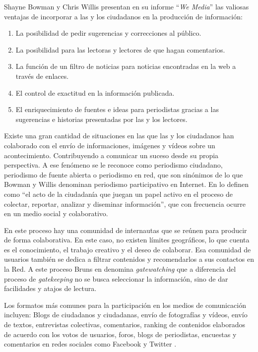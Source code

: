 Shayne Bowman y Chris Willis presentan en su informe ``\emph{We Media}'' \cite{wethemedia} las valiosas ventajas de incorporar a las y los ciudadanos en la producción de información:
\begin{enumerate}
\item La posibilidad de pedir sugerencias y correcciones al público.
\item La posibilidad para las lectoras y lectores de que hagan comentarios.
\item La función de un filtro de noticias para noticias encontradas en la web a través de enlaces.
\item El control de exactitud en la información publicada.
\item El enriquecimiento de fuentes e ideas para periodistas gracias a las sugerencias e historias presentadas por las y los lectores.
\end{enumerate}

Existe una gran cantidad de situaciones en las que las y los ciudadanos han colaborado con el envío de informaciones, imágenes y vídeos sobre un acontecimiento. Contribuyendo a comunicar un suceso desde su propia perspectiva. 
A ese fenómeno se le reconoce como periodismo ciudadano, periodismo de fuente abierta o periodismo en red, que son sinónimos de lo que Bowman y Willis denominan periodismo participativo en Internet. En \cite{wethemedia} lo definen como ``el acto de la ciudadanía que juegan un papel activo en el proceso de colectar, reportar, analizar y diseminar información'', que con frecuencia ocurre en un medio social y colaborativo. %

En este proceso hay una comunidad de internautas que se reúnen para producir de forma colaborativa. En este caso, no existen límites geográficos, lo que cuenta es el conocimiento, el trabajo creativo y el deseo de colaborar. Esa comunidad de usuarios también se dedica a filtrar contenidos y recomendarlos a sus contactos en la Red. A este proceso Bruns en \cite{quteprints189} denomina \emph{gatewatching} que a diferencia del proceso de \emph{gatekeeping} no se busca seleccionar la información, sino de dar facilidades y atajos de lectura.

Los formatos más comunes para la participación en los medios de comunicación incluyen: Blogs de ciudadanos y ciudadanas, envío de fotografías y vídeos, envío de textos, entrevistas colectivas, comentarios, ranking de contenidos elaborados de acuerdo con los votos de usuarios, foros, blogs de periodistas, encuestas y comentarios en redes sociales como Facebook y Twitter \cite{doi17512781003640703}. %

